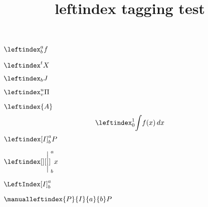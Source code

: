 \documentclass{article}
\title{leftindex tagging test}
\begin{document}
$ \leftindex^a_b {f} $

$ \leftindex^t {X} $

$ \leftindex_b {J} $

$ \leftindex_v^u {\Pi} $

$ \leftindex{A} $
\[
\leftindex ^1_0 { \int }
f(x)\, dx
\]
$\leftindex[I]^a_b {P}$

$\leftindex [][ \Bigg |]^a_b{x}$

$\LeftIndex[I]^a_b$

$\manualleftindex{P}{I}{a}{b} P$
\end{document}
